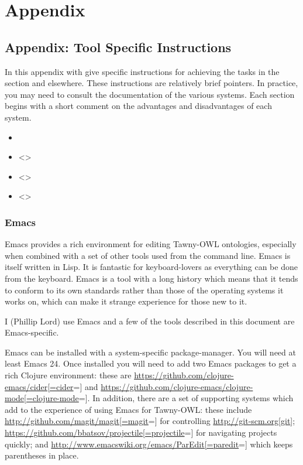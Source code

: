 
\section{Appendix}
\label{sec-6}

\subsection{Appendix: Tool Specific Instructions}
\label{sec-6-1}

In this appendix with give specific instructions for achieving the tasks
in the \label{/getting/started-Getting-Started} section and elsewhere. These
instructions are relatively brief pointers. In practice, you may need to
consult the documentation of the various systems. Each section begins
with a short comment on the advantages and disadvantages of each system.

\begin{itemize}
\item 
\item <>
\item <>
\item <>
\end{itemize}

\subsubsection{Emacs}
\label{sec:emacs}


Emacs provides a rich environment for editing Tawny-OWL ontologies,
especially when combined with a set of other tools used from the command
line. Emacs is itself written in Lisp. It is fantastic for
keyboard-lovers as everything can be done from the keyboard. Emacs is a
tool with a long history which means that it tends to conform to its own
standards rather than those of the operating systems it works on, which
can make it strange experience for those new to it.

I (Phillip Lord) use Emacs and a few of the tools described in this
document are Emacs-specific.



Emacs can be installed with a system-specific package-manager. You will
need at least Emacs 24. Once installed you will need to add two Emacs
packages to get a rich Clojure environment: these are
\url{https://github.com/clojure-emacs/cider[=cider}=] and
\url{https://github.com/clojure-emacs/clojure-mode[=clojure-mode}=]. In
addition, there are a set of supporting systems which add to the
experience of using Emacs for Tawny-OWL: these include
\url{http://github.com/magit/magit[=magit}=] for controlling
\url{http://git-scm.org[git}];
\url{https://github.com/bbatsov/projectile[=projectile}=] for navigating
projects quickly; and \url{http://www.emacswiki.org/emacs/ParEdit[=paredit}=]
which keeps parentheses in place.

